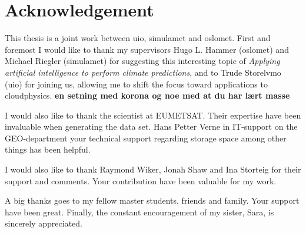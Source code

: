 \chapter*{Acknowledgement}
This thesis is a joint work between \acrfull{uio}, \acrfull{simulamet} and \acrfull{oslomet}. First and foremost I would like to thank my supervisors Hugo L. Hammer (\acrshort{oslomet}) and Michael Riegler (\acrshort{simulamet}) for suggesting this interesting topic of \textit{Applying artificial intelligence to perform climate predictions}, and to Trude Storelvmo (\acrshort{uio}) for joining us, allowing me to shift the focus toward applications to cloudphysics.
\textbf{en setning med korona og noe med at du har lært masse }

I would also like to thank the scientist at EUMETSAT. 
Their expertise have been invaluable when generating the data set. 
Hans Petter Verne in IT-support on the GEO-department your technical support regarding storage space among other things has been helpful.

I would also like to thank Raymond Wiker, Jonah Shaw and Ina Storteig for their support and comments. Your contribution have been valuable for my work.

A big thanks goes to my fellow master students, friends and family. Your support have been great. Finally, the constant encouragement of my sister, Sara, is sincerely appreciated.
\cleardoublepage